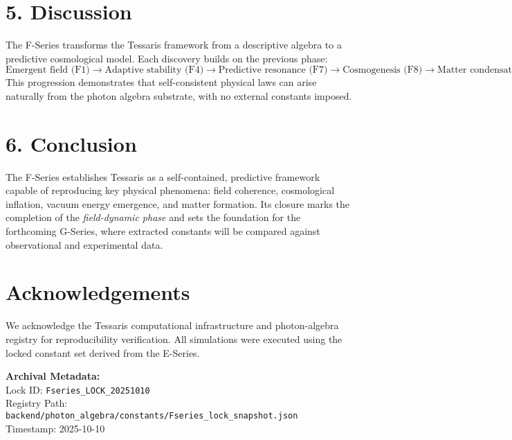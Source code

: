 \documentclass[12pt]{article}
\begin{document}
\section*{5. Discussion}
The F-Series transforms the Tessaris framework from a descriptive algebra to a predictive cosmological model.
Each discovery builds on the previous phase:
\[
\text{Emergent field (F1)} \rightarrow
\text{Adaptive stability (F4)} \rightarrow
\text{Predictive resonance (F7)} \rightarrow
\text{Cosmogenesis (F8)} \rightarrow
\text{Matter condensation (F9)} \rightarrow
\text{Multiverse equilibrium (F10)}.
\]
This progression demonstrates that self-consistent physical laws can arise naturally from the photon algebra substrate, with no external constants imposed.

\section*{6. Conclusion}
The F-Series establishes Tessaris as a self-contained, predictive framework capable of reproducing key physical phenomena:
field coherence, cosmological inflation, vacuum energy emergence, and matter formation.
Its closure marks the completion of the \emph{field-dynamic phase} and sets the foundation for the forthcoming G-Series, where extracted constants will be compared against observational and experimental data.

\section*{Acknowledgements}
We acknowledge the Tessaris computational infrastructure and photon-algebra registry for reproducibility verification.
All simulations were executed using the locked constant set derived from the E-Series.

\vspace{1em}
\noindent\textbf{Archival Metadata:}\\
Lock ID: \texttt{Fseries\_LOCK\_20251010}\\
Registry Path: \texttt{backend/photon\_algebra/constants/Fseries\_lock\_snapshot.json}\\
Timestamp: 2025-10-10
\end{document}
